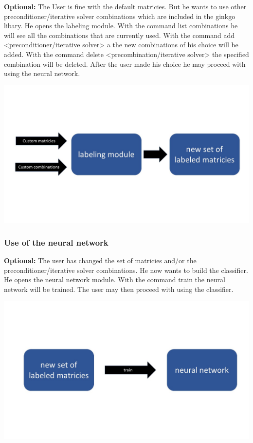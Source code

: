 \documentclass[parskip=full]{scrartcl}
\begin{document}
\textbf{Optional:} The User is fine with the default matricies. But he wants to use other preconditioner/iterative solver combinations which are included in the ginkgo libary. He opens the labeling module. With the command list combinations he will see all the combinations that are currently used. With the command add <preconditioner/iterative solver> a the new combinations of his choice will be added. With the command delete <precombination/iterative solver> the specified combination will be deleted. After the user made his choice he may proceed with using the neural network.
\begin{center}
\includegraphics[width=\textwidth]{labelingModule}
\end{center}


\subsubsection{Use of the neural network}
\textbf{Optional:} The user has changed the set of matricies and/or the preconditioner/iterative solver combinations. He now wants to build the classifier. He opens the neural network module. With the command train the neural network will be trained. The user may then proceed with using the classifier.

\begin{center}
\includegraphics[width=\textwidth]{neuralNetwork}
\end{center}
\end{document}
